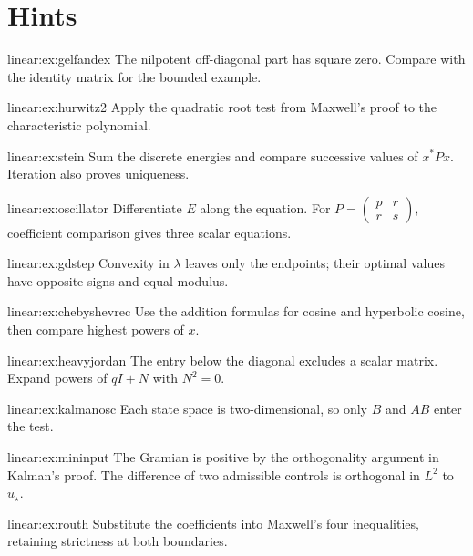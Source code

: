 \section{Hints}
\begin{hint}{linear:ex:gelfandex}
The nilpotent off-diagonal part has square zero. Compare with the identity matrix for the bounded example.
\end{hint}
\begin{hint}{linear:ex:hurwitz2}
Apply the quadratic root test from Maxwell's proof to the characteristic polynomial.
\end{hint}
\begin{hint}{linear:ex:stein}
Sum the discrete energies and compare successive values of $x^*Px$. Iteration also proves uniqueness.
\end{hint}
\begin{hint}{linear:ex:oscillator}
Differentiate $E$ along the equation. For $P=\left(\begin{smallmatrix}p&r\\r&s\end{smallmatrix}\right)$, coefficient comparison gives three scalar equations.
\end{hint}
\begin{hint}{linear:ex:gdstep}
Convexity in $\lambda$ leaves only the endpoints; their optimal values have opposite signs and equal modulus.
\end{hint}
\begin{hint}{linear:ex:chebyshevrec}
Use the addition formulas for cosine and hyperbolic cosine, then compare highest powers of $x$.
\end{hint}
\begin{hint}{linear:ex:heavyjordan}
The entry below the diagonal excludes a scalar matrix. Expand powers of $qI+N$ with $N^2=0$.
\end{hint}
\begin{hint}{linear:ex:kalmanosc}
Each state space is two-dimensional, so only $B$ and $AB$ enter the test.
\end{hint}
\begin{hint}{linear:ex:mininput}
The Gramian is positive by the orthogonality argument in Kalman's proof. The difference of two admissible controls is orthogonal in $L^2$ to $u_\star$.
\end{hint}
\begin{hint}{linear:ex:routh}
Substitute the coefficients into Maxwell's four inequalities, retaining strictness at both boundaries.
\end{hint}
